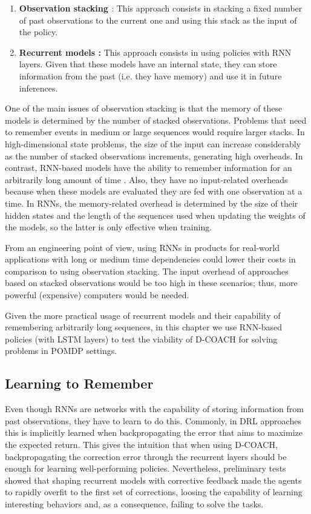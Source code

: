 \begin{enumerate}
    \item \textbf{Observation stacking \cite{atari}}: This approach consists in stacking a fixed number of past observations to the current one and using this stack as the input of the policy. 
    \item \textbf{Recurrent models \cite{hausknecht2015deep}:} This approach consists in using policies with RNN layers. Given that these models have an internal state, they can store information from the past (i.e. they have memory) and use it in future inferences. 
\end{enumerate}

One of the main issues of observation stacking is that the memory of these models is determined by the number of stacked observations. Problems that need to remember events in medium or large sequences would require larger stacks. In high-dimensional state problems, the size of the input can increase considerably as the number of stacked observations increments, generating high overheads. In contrast, RNN-based models have the ability to remember information for an arbitrarily long amount of time \cite{lample2017playing}. Also, they have no input-related overheads because when these models are evaluated they are fed with one observation at a time. In RNNs, the memory-related overhead is determined by the size of their hidden states and the length of the sequences used when updating the weights of the models, so the latter is only effective when training.

From an engineering point of view, using RNNs in products for real-world applications with long or medium time dependencies could lower their costs in comparison to using observation stacking. The input overhead of approaches based on stacked observations would be too high in these scenarios; thus, more powerful (expensive) computers would be needed. 

Given the more practical usage of recurrent models and their capability of remembering arbitrarily long sequences, in this chapter we use RNN-based policies (with LSTM layers) to test the viability of D-COACH for solving problems in POMDP settings. 

\subsection{Learning to Remember}
Even though RNNs are networks with the capability of storing information from past observations, they have to learn to do this. Commonly, in DRL approaches this is implicitly learned when backpropagating the error that aims to maximize the expected return. This gives the intuition that when using D-COACH, backpropagating the correction error through the recurrent layers should be enough for learning well-performing policies. Nevertheless, preliminary tests showed that shaping recurrent models with corrective feedback made the agents to rapidly overfit to the first set of corrections, loosing the capability of learning interesting behaviors and, as a consequence, failing to solve the tasks. 

